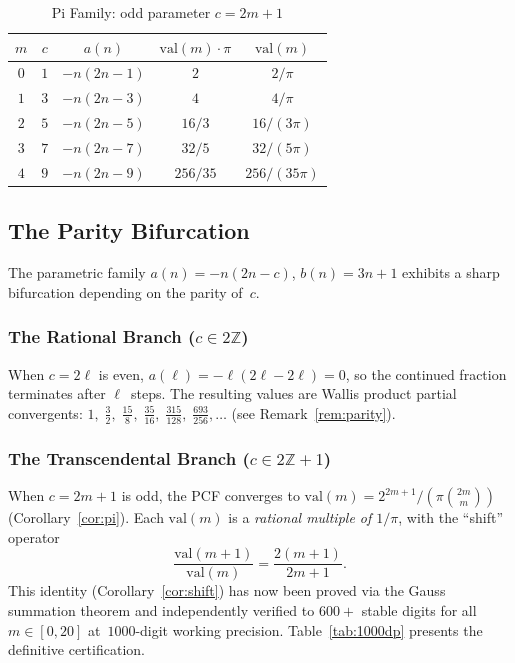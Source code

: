 \documentclass[11pt,a4paper]{article}
\theoremstyle{plain}
\theoremstyle{remark}
\begin{document}
\begin{table}[h]
\centering
\caption{Pi Family: odd parameter $c = 2m{+}1$}\label{tab:pi}
\begin{tabular}{@{}ccccc@{}}
\toprule
$m$ & $c$ & $a(n)$ & $\mathrm{val}(m)\cdot\pi$ & $\mathrm{val}(m)$ \\
\midrule
$0$ & $1$ & $-n(2n{-}1)$ & $2$ & $2/\pi$ \\
$1$ & $3$ & $-n(2n{-}3)$ & $4$ & $4/\pi$ \\
$2$ & $5$ & $-n(2n{-}5)$ & $16/3$ & $16/(3\pi)$ \\
$3$ & $7$ & $-n(2n{-}7)$ & $32/5$ & $32/(5\pi)$ \\
$4$ & $9$ & $-n(2n{-}9)$ & $256/35$ & $256/(35\pi)$ \\
\bottomrule
\end{tabular}
\end{table}

\subsection{The Parity Bifurcation}\label{sec:bifurcation}

The parametric family $a(n) = -n(2n{-}c)$, $b(n) = 3n{+}1$
exhibits a sharp bifurcation depending on the parity of~$c$.

\subsubsection{The Rational Branch ($c \in 2\mathbb{Z}$)}\label{sec:rational-branch}

When $c = 2\ell$ is even, $a(\ell) = -\ell(2\ell - 2\ell) = 0$,
so the continued fraction terminates after $\ell$~steps.
The resulting values are Wallis product partial convergents:
$1,\;\frac{3}{2},\;\frac{15}{8},\;\frac{35}{16},\;\frac{315}{128},\;\frac{693}{256},\ldots$
(see Remark~\ref{rem:parity}).

\subsubsection{The Transcendental Branch ($c \in 2\mathbb{Z}+1$)}\label{sec:transcendental-branch}

When $c = 2m{+}1$ is odd, the PCF converges to
$\mathrm{val}(m) = 2^{2m+1}/(\pi\binom{2m}{m})$
(Corollary~\ref{cor:pi}).
Each $\mathrm{val}(m)$ is a \emph{rational multiple of $1/\pi$},
with the ``shift'' operator
\begin{equation}\label{eq:shift}
  \frac{\mathrm{val}(m{+}1)}{\mathrm{val}(m)}
  = \frac{2(m{+}1)}{2m{+}1}.
\end{equation}
This identity (Corollary~\ref{cor:shift}) has now been
proved via the Gauss summation theorem and independently verified
to $600{+}$ stable digits for all $m \in [0, 20]$
at~$1000$-digit working precision.
Table~\ref{tab:1000dp} presents the definitive
certification.
\end{document}
